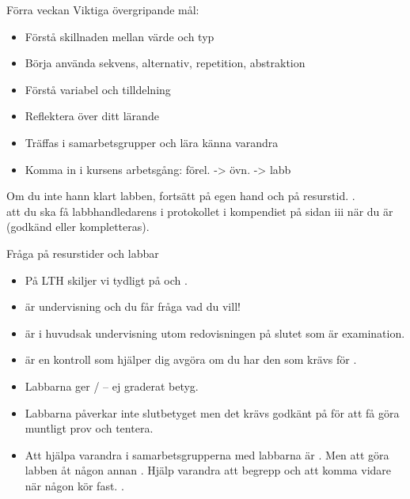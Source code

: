 

\begin{SlideExtra}{Förra veckan}
Viktiga övergripande mål:
\begin{itemize}
\item Förstå skillnaden mellan värde och typ
\item Börja använda sekvens, alternativ, repetition, abstraktion
\item Förstå variabel och tilldelning
\item Reflektera över ditt lärande
\item Träffas i samarbetsgrupper och lära känna varandra
\item Komma in i kursens arbetsgång: förel. -> övn. -> labb
\end{itemize}
Om du inte hann klart labben, fortsätt på egen hand och på resurstid. .
\\ 
 att du ska få labbhandledarens  i protokollet i kompendiet på sidan iii när du är  (godkänd eller kompletteras).
\end{SlideExtra}

\begin{SlideExtra}{Fråga på resurstider och labbar}
\begin{itemize}
  \item På LTH skiljer vi tydligt på  och .
  \item {} är undervisning och du får fråga vad du vill!
  \item {} är i huvudsak undervisning utom redovisningen på slutet som är examination. 
  \item {} är en kontroll som hjälper dig avgöra om du har den  som krävs för .
  \item Labbarna ger / -- ej graderat betyg. 
  \item Labbarna påverkar inte slutbetyget men det krävs godkänt på   för att få göra muntligt prov och tentera.
  \item Att hjälpa varandra i samarbetsgrupperna med labbarna är . Men att göra labben åt någon annan . Hjälp varandra att  begrepp och att komma vidare när någon kör fast. .
\end{itemize}  
\end{SlideExtra}


